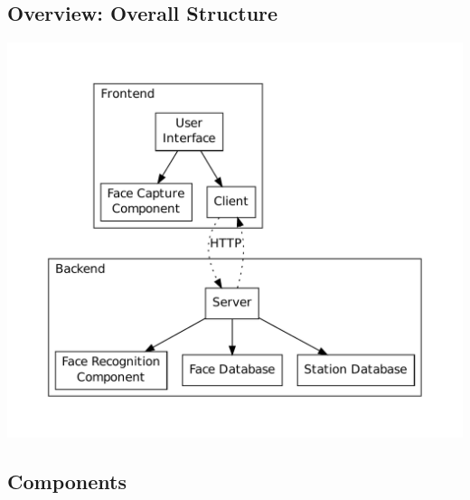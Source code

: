 \documentclass[11pt]{article}
\begin{document}
\subsection{Overview: Overall Structure}
\includegraphics[scale=0.5]{components.pdf}

\subsection{Components}

\end{document}
